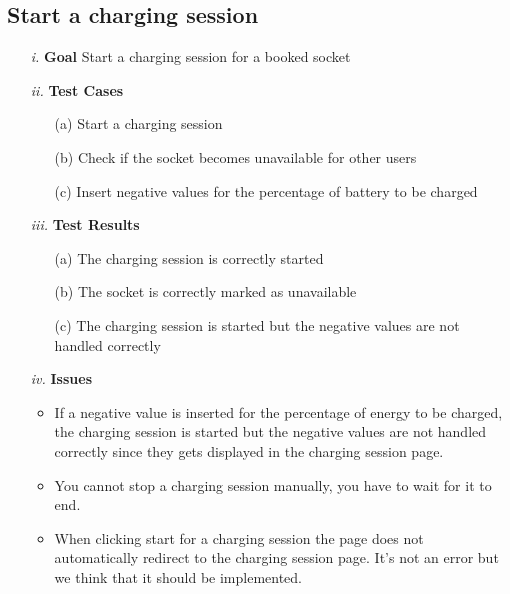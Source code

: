 \documentclass[table, 12pt]{article}
\begin{document}
\subsection{Start a charging session}
\begin{itemize}
    \item[\textit{i.}] \textbf{Goal} Start a charging session for a booked socket
    \item[\textit{ii.}] \textbf{Test Cases}
        \begin{itemize}
            \item[(a)] Start a charging session
            \item[(b)] Check if the socket becomes unavailable for other users
            \item[(c)] Insert negative values for the percentage of battery to be charged
        \end{itemize}
    \item[\textit{iii.}] \textbf{Test Results}
        \begin{itemize}
            \item[(a)] The charging session is correctly started
            \item[(b)] The socket is correctly marked as unavailable
            \item[(c)] The charging session is started but the negative values are not handled correctly
        \end{itemize}
    \item[\textit{iv.}] \textbf{Issues}
    \begin{itemize}
        \item If a negative value is inserted for the percentage of energy to be charged, the charging session is started but the negative values are not handled correctly since they gets displayed in the charging session page.
        \item You cannot stop a charging session manually, you have to wait for it to end.
        \item When clicking start for a charging session the page does not automatically redirect to the charging session page. It's not an error but we think that it should be implemented.
    \end{itemize} 
\end{itemize}
\end{document}
